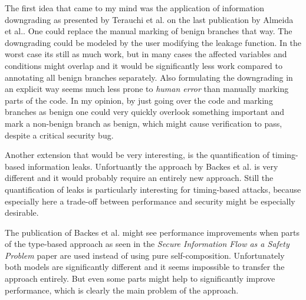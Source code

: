 \documentclass[a4paper,UKenglish]{lipics-v2018}
\begin{document}
The first idea that came to my mind was the application of information downgrading as presented by Terauchi et al.\cite{secure_information_flow_safety} on the last publication by Almeida et al.\cite{verifying_constant_time_implementations}. One could replace the manual marking of benign branches that way. The downgrading could be modeled by the user modifying the leakage function. In the worst case its still as much work, but in many cases the affected variables and conditions might overlap and it would be significantly less work compared to annotating all benign branches separately. Also formulating the downgrading in an explicit way seems much less prone to \textit{human error} than manually marking parts of the code. In my opinion, by just going over the code and marking branches as benign one could very quickly overlook something important and mark a non-benign branch as benign, which might cause verification to pass, despite a critical security bug.

Another extension that would be very interesting, is the quantification of timing-based information leaks. Unfortuantly the approach by Backes et al.\cite{automatic_discovery_and_quantification} is very different and it would probably require an entirely new approach. Still the quantification of leaks is particularly interesting for timing-based attacks, because especially here a trade-off between performance and security might be especially desirable.

The publication of Backes et al.\cite{automatic_discovery_and_quantification} might see performance improvements when parts of the type-based approach as seen in the \textit{Secure Information Flow as a Safety Problem} paper are used instead of using pure self-composition. Unfortunately both models are significantly different and it seems impossible to transfer the approach entirely. But even some parts might help to significantly improve performance, which is clearly the main problem of the approach.


\newpage

\end{document}

